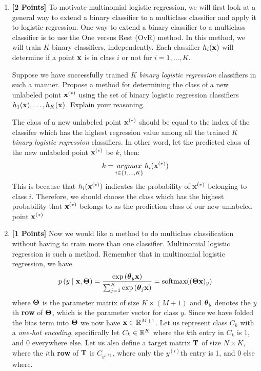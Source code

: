\begin{enumerate}[label=(\alph*)]
    \item {\bf [2 Points]} To motivate multinomial logistic regression, we will first look at a general way to extend a binary classifier to a multiclass classifier and apply it to logistic regression. One way to extend a binary classifier to a multiclass classifier is to use the One versus Rest (OvR) method. In this method, we will train $K$ binary classifiers, independently. Each classifier $h_i(\mathbf{x})$  will determine if a point $\mathbf{x}$ is in class $i$ or not for $i = 1, \ldots, K$. 
    
    Suppose we have successfully trained $K$ \emph{binary logistic regression} classifiers in such a manner. Propose a method for determining the class of a new unlabeled point $\mathbf{x}^{(*)}$ using the set of binary logistic regression classifiers $h_1(\mathbf{x}), \ldots, h_K(\mathbf{x})$. Explain your reasoning. 

    
    \begin{solution}
    The class of a new unlabeled point $\mathbf{x}^{(*)}$ should be equal to the index of the classifer which has the highest regression value among all the trained $K$ \emph{binary logistic regression} classifiers. In other word, let the predicted class of the new unlabeled point $\mathbf{x}^{(*)}$ be $k$, then:
    $$
    k = \mathop{argmax}_{i \in \{1, \dots, K\}}h_i(\mathbf{x}^{(*)})
    $$
    This is because that $h_i(\mathbf{x}^{(*)})$ indicates the probability of $\mathbf{x}^{(*)}$ belonging to class $i$. Therefore, we should choose the class which has the highest probability that $\mathbf{x}^{(*)}$ belongs to as the prediction class of our new unlabeled point $\mathbf{x}^{(*)}$
    \end{solution}
    
    
    
    
    \clearpage
    \item {\bf [1 Points]} Now we would like a method to do multiclass classification without having to train more than one classifier. Multinomial logistic regression is such a method. Remember that in multinomial logistic regression, we have
    \[
    p\left(y \mid \mathbf{x}, \boldsymbol \Theta\right) = \frac{\exp\left(\boldsymbol \theta_{y} \mathbf{x} \right)}{\sum_{j = 1}^K \exp\left(\boldsymbol \theta_{j} \mathbf{x}\right)} = \text{softmax}((\boldsymbol \Theta \mathbf{x})_y)
    \]
    where $\boldsymbol \Theta$ is the parameter matrix of size $K \times (M + 1)$ and $\boldsymbol \theta_y$ denotes the $y$th \textbf{row} of $\boldsymbol \Theta$, which is the parameter vector for class $y$. Since we have folded the bias term into $\boldsymbol \Theta$ we now have $\mathbf{x} \in \mathbb{R}^{M + 1}$. Let us represent class $C_k$ with a \emph{one-hot encoding}, specifically let $C_k \in \mathbb{R}^K$ where the $k$th entry in $C_k$ is 1, and 0 everywhere else. Let us also define a target matrix $\mathbf{T}$ of size $N \times K$, where the $i$th {\bf row} of $\mathbf{T}$ is $C_{y^{(i)}}$, where only the  $y^{(i)}$th entry is 1, and 0 else where.
    

\end{enumerate}
